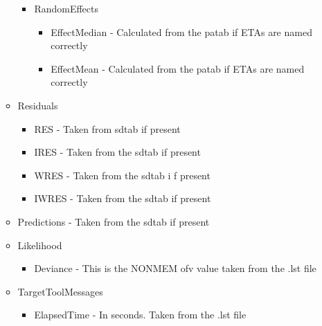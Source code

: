 \begin{itemize}
\begin{itemize}
\begin{itemize}
\begin{itemize}
                \end{itemize}
                \item RandomEffects
                \begin{itemize}
                    \item EffectMedian - Calculated from the patab if ETAs are named correctly
                    \item EffectMean - Calculated from the patab if ETAs are named correctly
                \end{itemize}
            \end{itemize}
            \item Residuals
                \begin{itemize}
                    \item RES - Taken from sdtab if present
                    \item IRES - Taken from the sdtab if present
                    \item WRES - Taken from the sdtab i f present
                    \item IWRES - Taken from the sdtab if present
                \end{itemize}
            \item Predictions - Taken from the sdtab if present
            \item Likelihood
                \begin{itemize}
                    \item Deviance - This is the NONMEM ofv value taken from the .lst file
                \end{itemize}
            \item TargetToolMessages
                \begin{itemize}
                    \item ElapsedTime - In seconds. Taken from the .lst file
                \end{itemize}
        \end{itemize}
\end{itemize}



